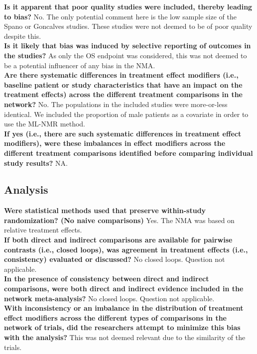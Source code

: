 \textbf{Is it apparent that poor quality studies were included, thereby
leading to bias?} No. The only potential comment here is the low sample size of the Spano or Goncalves studies. These studies were not deemed to be of poor quality despite this.\\

\textbf{Is it likely that bias was induced by selective reporting of
outcomes in the studies?} As only the OS endpoint was considered, this was not deemed to be a potential influencer of any bias in the NMA.\\

\textbf{Are there systematic differences in treatment effect modifiers
(i.e., baseline patient or study characteristics that have an
impact on the treatment effects) across the different treatment
comparisons in the network?} No. The populations in the included studies were more-or-less identical. We included the proportion of male patients as a covariate in order to use the ML-NMR method.\\

\textbf{If yes (i.e., there are such systematic differences in treatment
effect modifiers), were these imbalances in effect modifiers
across the different treatment comparisons identified before
comparing individual study results?} NA.\\

\subsection{Analysis}
\textbf{Were statistical methods used that preserve within-study
randomization? (No naive comparisons)} Yes. The NMA was based on relative treatment effects. \\

\textbf{If both direct and indirect comparisons are available for
pairwise contrasts (i.e., closed loops), was agreement in
treatment effects (i.e., consistency) evaluated or discussed?} No closed loops. Question not applicable. \\

\textbf{In the presence of consistency between direct and indirect
comparisons, were both direct and indirect evidence included in
the network meta-analysis?} No closed loops. Question not applicable. \\

\textbf{With inconsistency or an imbalance in the distribution of
treatment effect modifiers across the different types of
comparisons in the network of trials, did the researchers
attempt to minimize this bias with the analysis?} This was not deemed relevant due to the similarity of the trials. \\

